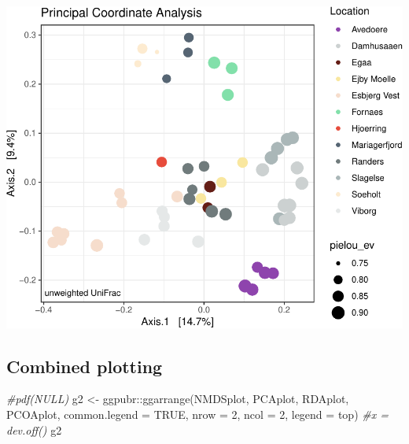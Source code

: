 \documentclass[
]{book}
\newenvironment{Shaded}{\begin{snugshade}}{\end{snugshade}}
\newcommand{\AttributeTok}[1]{\textcolor[rgb]{0.77,0.63,0.00}{#1}}
\newcommand{\CommentTok}[1]{\textcolor[rgb]{0.56,0.35,0.01}{\textit{#1}}}
\newcommand{\ConstantTok}[1]{\textcolor[rgb]{0.00,0.00,0.00}{#1}}
\newcommand{\DecValTok}[1]{\textcolor[rgb]{0.00,0.00,0.81}{#1}}
\newcommand{\FunctionTok}[1]{\textcolor[rgb]{0.00,0.00,0.00}{#1}}
\newcommand{\NormalTok}[1]{#1}
\newcommand{\OtherTok}[1]{\textcolor[rgb]{0.56,0.35,0.01}{#1}}
\newcommand{\SpecialCharTok}[1]{\textcolor[rgb]{0.00,0.00,0.00}{#1}}
\newcommand{\StringTok}[1]{\textcolor[rgb]{0.31,0.60,0.02}{#1}}
\begin{document}
\includegraphics{gitbook-demo_files/figure-latex/unifrac-1.pdf}

\hypertarget{combined-plotting-1}{%
\subsection{Combined plotting}\label{combined-plotting-1}}

\begin{Shaded}
\begin{Highlighting}[]
\CommentTok{\#pdf(NULL)}
\NormalTok{g2 }\OtherTok{\textless{}{-}}\NormalTok{ ggpubr}\SpecialCharTok{::}\FunctionTok{ggarrange}\NormalTok{(NMDSplot, PCAplot, RDAplot, PCOAplot,}
                        \AttributeTok{common.legend =} \ConstantTok{TRUE}\NormalTok{, }\AttributeTok{nrow =} \DecValTok{2}\NormalTok{, }\AttributeTok{ncol =} \DecValTok{2}\NormalTok{, }\AttributeTok{legend =} \StringTok{\textquotesingle{}top\textquotesingle{}}\NormalTok{)}
\CommentTok{\#x = dev.off()}
\NormalTok{g2}
\end{Highlighting}
\end{Shaded}
\end{document}
